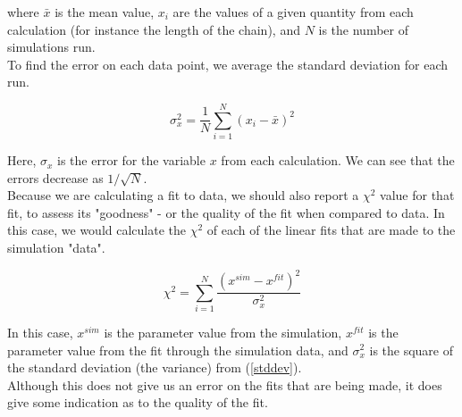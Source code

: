 \documentclass{article}
\begin{document}
\begin{multicols}{2}
\noindent where $\bar x$ is the mean value, $x_i$ are the values of a given quantity from each calculation (for instance the length of the chain), and $N$ is the number of simulations run.\\

To find the error on each data point, we average the standard deviation for each run.

\begin{equation}
\label{stddev}
\sigma _x^2 = \frac{1}{N} \sum \limits _{i=1} ^N (x_i - \bar x)^2
\end{equation}

\noindent Here, $\sigma _x$ is the error for the variable $x$ from each calculation.  We can see that the errors decrease as $1/\sqrt{N}$.  \\

Because we are calculating a fit to data, we should also report a $\chi ^2$ value for that fit, to assess its "goodness" - or the quality of the fit when compared to data.  \cite{Nunes}  In this case, we would calculate the $\chi^2$ of each of the linear fits that are made to the simulation "data".

\begin{equation}
\chi ^2 = \sum \limits _{i=1} ^N \frac{(x^{sim} - x^{fit})^2}{\sigma _x ^2}
\end{equation}

\noindent In this case, $x^{sim}$ is the parameter value from the simulation, $x^{fit}$ is the parameter value from the fit through the simulation data, and $\sigma _x ^2$ is the square of the standard deviation (the variance) from (\ref{stddev}). \\

Although this does not give us an error on the fits that are being made, it does give some indication as to the quality of the fit.

\end{multicols}


\end{document}
